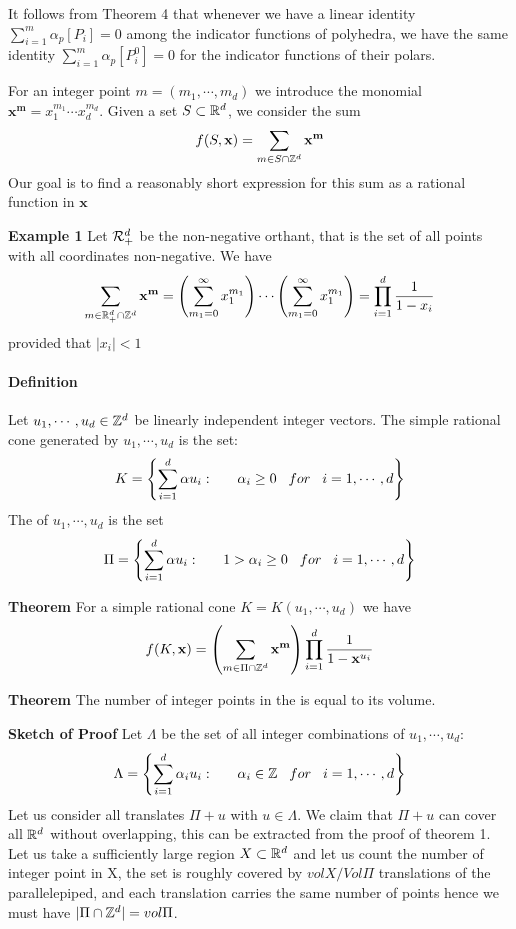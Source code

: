 \begin{description}
It follows from Theorem 4 that whenever we have a linear identity $\sum^m_{i=1}\alpha_p[P_i]=0$ among the indicator functions of polyhedra, we have the same identity $\sum^m_{i=1}\alpha_p[P_i^0]=0$ for the indicator functions of their polars.

For an integer point $m=(m_1,\cdots ,m_d)$ we introduce the monomial $\mathbf{x}^\mathbf{m}=x_1^{m_1}\cdots x_d^{m_d}$. Given a set $S\subset \mathbb{R}^d$, we consider the sum
$$f(S,\mathbf{x})=\sum_{m\in S\cap\mathbb{Z}^d}\mathbf{x}^\mathbf{m}$$
Our goal is to find a reasonably short expression for this sum as a rational function in $\mathbf{x}$

\textbf{Example 1}
Let $\mathcal{R}_+^d$ be the non-negative orthant, that is the set of all points with all coordinates non-negative. We have
$$\sum_{m\in\mathbb{R}^d_+\cap\mathbb{Z}^d}\mathbf{x}^\mathbf{m}=\left(\sum^{\infty}_{m_1=0}x_1^{m_1}\right)\cdots\left(\sum^{\infty}_{m_1=0}x_1^{m_1}\right)=\prod_{i=1}^d\frac{1}{1-x_i}$$
provided that $|x_i|<1$

\paragraph{Definition } Let $u_1,\cdots ,u_d\in\mathbb{Z}^d$ be linearly independent integer vectors. The simple rational cone generated by $u_1,\cdots ,u_d$ is the set:
$$K=\left\lbrace\sum^d_{i=1}\alpha u_i:\hspace{6mm}\alpha_i\geq 0 \hspace{3mm}for\hspace{3mm}i=1,\cdots ,d\right\rbrace$$
The {\fundPip} of $u_1,\cdots ,u_d$ is the set
$$\Pi=\left\lbrace\sum^d_{i=1}\alpha u_i:\hspace{6mm}1>\alpha_i\geq 0 \hspace{3mm}for\hspace{3mm}i=1,\cdots ,d\right\rbrace$$

\textbf{Theorem}
For a simple rational cone $K=K(u_1,\cdots ,u_d)$ we have
$$f(K,\mathbf{x})=\left(\sum_{m\in\Pi\cap\mathbb{Z}^d}\mathbf{x}^\mathbf{m}\right)\prod_{i=1}^d\frac{1}{1-\mathbf{x}^{u_i}}$$

\textbf{Theorem}
The number of integer points in the {\fundPip} is equal to its volume.

\textbf{Sketch of Proof}
Let $\Lambda$ be the set of all integer combinations of $u_1,\cdots ,u_d$:
$$\Lambda=\left\lbrace\sum^d_{i=1}\alpha_i u_i:\hspace{6mm}\alpha_i\in\mathbb{Z} \hspace{3mm}for\hspace{3mm}i=1,\cdots ,d\right\rbrace$$
Let us consider all translates $\Pi+u$ with $u\in\Lambda$. We claim that $\Pi+u$ can cover all $\mathbb{R}^d$ without overlapping, this can be extracted from the proof of theorem 1. Let us take a sufficiently large  region $X\subset\mathbb{R}^d$ and let us count the number of integer point in X, the set is roughly covered by $vol X/Vol\Pi$ translations of the parallelepiped, and each translation carries the same number of points hence we must have $|\Pi\cap\mathbb{Z}^d|=vol\Pi$.
\end{description}
